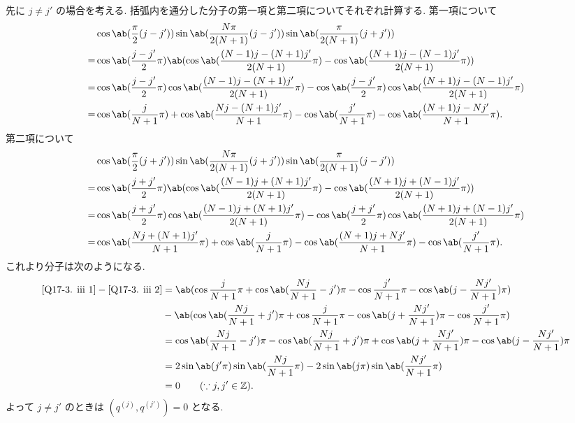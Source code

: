 \documentclass[uplatex,dvipdfmx,a4paper,11pt]{jlreq}
\newcommand{\ZZ}{\mathbb{Z}}
\numberwithin{equation}{section}
\theoremstyle{definition}
\begin{document}
先に $j \neq j'$ の場合を考える. 括弧内を通分した分子の第一項と第二項についてそれぞれ計算する. 第一項について
\begin{align}
    & \cos\ab(\frac{\pi}{2}(j - j'))\sin\ab(\frac{N\pi}{2(N+1)}(j - j'))\sin\ab(\frac{\pi}{2(N+1)}(j + j'))                                                      \\
  = & \cos\ab(\frac{j - j'}{2}\pi)\ab(\cos\ab(\frac{(N-1)j - (N+1)j'}{2(N+1)}\pi) - \cos\ab(\frac{(N+1)j - (N-1)j'}{2(N+1)}\pi))                                 \\
  = & \cos\ab(\frac{j - j'}{2}\pi)\cos\ab(\frac{(N-1)j - (N+1)j'}{2(N+1)}\pi) - \cos\ab(\frac{j - j'}{2}\pi)\cos\ab(\frac{(N+1)j - (N-1)j'}{2(N+1)}\pi)          \\
  = & \cos\ab(\frac{j}{N+1}\pi) + \cos\ab(\frac{Nj - (N+1)j'}{N+1}\pi) - \cos\ab(\frac{j'}{N+1}\pi) - \cos\ab(\frac{(N+1)j - Nj'}{N+1}\pi). \label{Q17-3. iii 1}
\end{align}
第二項について
\begin{align}
    & \cos\ab(\frac{\pi}{2}(j + j'))\sin\ab(\frac{N\pi}{2(N+1)}(j + j'))\sin\ab(\frac{\pi}{2(N+1)}(j - j'))                                                      \\
  = & \cos\ab(\frac{j + j'}{2}\pi)\ab(\cos\ab(\frac{(N-1)j + (N+1)j'}{2(N+1)}\pi) - \cos\ab(\frac{(N+1)j + (N-1)j'}{2(N+1)}\pi))                                 \\
  = & \cos\ab(\frac{j + j'}{2}\pi)\cos\ab(\frac{(N-1)j + (N+1)j'}{2(N+1)}\pi) - \cos\ab(\frac{j + j'}{2}\pi)\cos\ab(\frac{(N+1)j + (N-1)j'}{2(N+1)}\pi)          \\
  = & \cos\ab(\frac{Nj + (N+1)j'}{N+1}\pi) + \cos\ab(\frac{j}{N+1}\pi) - \cos\ab(\frac{(N+1)j + Nj'}{N+1}\pi) - \cos\ab(\frac{j'}{N+1}\pi). \label{Q17-3. iii 2}
\end{align}
これより分子は次のようになる.
\begin{align}
  \eqref{Q17-3. iii 1} - \eqref{Q17-3. iii 2} & = \ab(\cos\frac{j}{N+1}\pi + \cos\ab(\frac{Nj}{N+1} - j')\pi - \cos\frac{j'}{N+1}\pi - \cos\ab(j - \frac{Nj'}{N+1})\pi)                 \\
                                              & - \ab(\cos\ab(\frac{Nj}{N+1} + j')\pi + \cos\frac{j}{N+1}\pi - \cos\ab(j + \frac{Nj'}{N+1})\pi - \cos\frac{j'}{N+1}\pi)                 \\
                                              & = \cos\ab(\frac{Nj}{N+1} - j')\pi - \cos\ab(\frac{Nj}{N+1} + j')\pi + \cos\ab(j + \frac{Nj'}{N+1})\pi - \cos\ab(j - \frac{Nj'}{N+1})\pi \\
                                              & = 2\sin\ab(j'\pi)\sin\ab(\frac{Nj}{N+1}\pi) - 2\sin\ab(j\pi)\sin\ab(\frac{Nj'}{N+1}\pi)                                                 \\
                                              & = 0 \qquad (\because j, j'\in\ZZ).
\end{align}
よって $j \neq j'$ のときは $(q^{(j)}, q^{(j')}) = 0$ となる.
\end{document}
